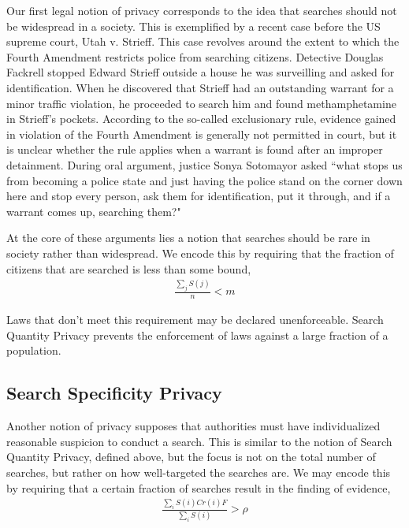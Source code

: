 Our first legal notion of privacy corresponds to the idea that searches should not be widespread in a society.  This is exemplified by a recent case before the US supreme court, Utah v. Strieff.  This case revolves around the extent to which the Fourth Amendment restricts police from searching citizens.  Detective Douglas Fackrell stopped Edward Strieff outside a house he was surveilling and asked for identification.  When he discovered that Strieff had an outstanding warrant for a minor traffic violation, he proceeded to search him and found methamphetamine in Strieff's pockets.  According to the so-called exclusionary rule, evidence gained in violation of the Fourth Amendment is generally not permitted in court, but it is unclear whether the rule applies when a warrant is found after an improper detainment.  During oral argument, justice Sonya Sotomayor asked ``what stops us from becoming a police state and just having the police stand on the corner down here and stop every person, ask them for identification, put it through, and if a warrant comes up, searching them?"

At the core of these arguments lies a notion that searches should be rare in society rather than widespread.  We encode this by requiring that the fraction of citizens that are searched is less than some bound, 
\begin{align}
\frac{\sum_j S(j)}{n} < m
\end{align}

Laws that don't meet this requirement may be declared unenforceable.  Search Quantity Privacy prevents the enforcement of laws against a large fraction of a population.


\subsection{Search Specificity Privacy}

Another notion of privacy supposes that authorities must have individualized reasonable suspicion to conduct a search.  This is similar to the notion of Search Quantity Privacy, defined above, but the focus is not on the total number of searches, but rather on how well-targeted the searches are.  We may encode this by requiring that a certain fraction of searches result in the finding of evidence,
\begin{align}
\frac{\sum_i S(i)Cr(i)F}{\sum_i S(i)} > \rho
\end{align}



